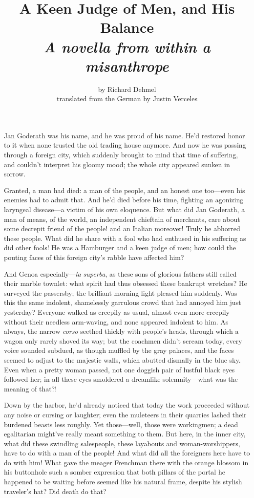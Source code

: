 \documentclass[12pt,a4paper]{article}
\title{A Keen Judge of Men, and His Balance\\ \large{\textit{A novella from within a misanthrope}}}
\author{by Richard Dehmel\\translated from the German by Justin Verceles}
\date{}
\begin{document}
\maketitle

Jan Goderath was his name, and he was proud of his name. He’d restored honor to it when none trusted the old trading house anymore. And now he was passing through a foreign city, which suddenly brought to mind that time of suffering, and couldn’t interpret his gloomy mood; the whole city appeared sunken in sorrow.

Granted, a man had died: a man of the people, and an honest one too—even his enemies had to admit that. And he’d died before his time, fighting an agonizing laryngeal disease—a victim of his own eloquence. But what did Jan Goderath, a man of means, of the world, an independent chieftain of merchants, care about some  decrepit friend of the people! and an Italian moreover! Truly he abhorred these people. What did he share with a fool who had enthused in his suffering as did other fools! He was a Hamburger and a keen judge of men; how could the pouting faces of this foreign city’s rabble have affected him?

And Genoa especially—\textit{la superba}, as these sons of glorious fathers still called their marble townlet: what spirit had thus obsessed these bankrupt wretches? He surveyed the passersby; the brilliant morning light pleased him suddenly. Was this the same indolent, shamelessly garrulous crowd that had annoyed him just yesterday? Everyone walked as creepily as usual, almost even more creepily without their needless arm-waving, and none appeared indolent to him. As always, the narrow \textit{corso} seethed thickly with people’s heads, through which a wagon only rarely shoved its way; but the coachmen didn’t scream today, every voice sounded subdued, as though muffled by the gray palaces, and the faces seemed to adjust to the majestic walls, which abutted dismally in the blue sky. Even when a pretty woman passed, not one doggish pair of lustful black eyes followed her; in all these eyes smoldered a dreamlike solemnity—what was the meaning of that?!

Down by the harbor, he’d already noticed that today the work proceeded without any noise or cursing or laughter; even the muleteers in their quarries lashed their burdened beasts less roughly. Yet those—well, those were workingmen; a dead egalitarian might’ve really meant something to them. But here, in the inner city, what did these swindling salespeople, these layabouts and woman-worshippers, have to do with a man of the people! And what did all the foreigners here have to do with him! What gave the meager Frenchman there with the orange blossom in his buttonhole such a somber expression that both pillars of the portal he happened to be waiting before seemed like his natural frame, despite his stylish traveler’s hat? Did death do that?
\end{document}
